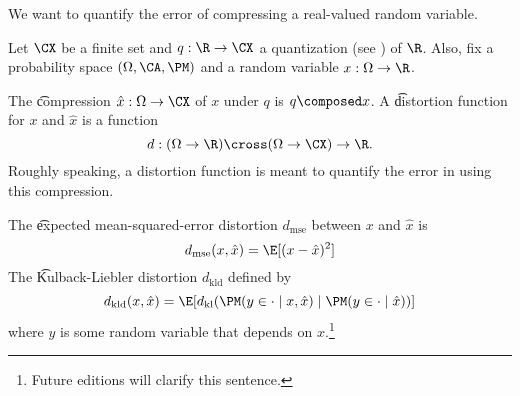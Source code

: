 


We want to quantify the error of compressing a real-valued random variable.


Let $\CX$ be a finite set and $q: \R \to \CX$ a quantization (see ) of $\R$.
Also, fix a probability space $(\Omega, \CA, \PM)$ and a random variable $x: \Omega \to \R$.


The \t{compression} $\hat{x}: \Omega \to \CX$ of $x$ under $q$ is $q \composed x$.
A \t{distortion function} for $x$ and $\hat{x}$ is a function
\[
  d: (\Omega \to \R) \cross (\Omega \to \CX) \to \R.
\]
Roughly speaking, a distortion function is meant to quantify the error in using this compression.


The \t{expected mean-squared-error distortion} $d_{\text{mse}}$ between $x$ and $\hat{x}$ is
\[
  d_{\text{mse}}(x, \hat{x}) = \E[(x - \hat{x})^2]
\]
The \t{Kulback-Liebler distortion} $d_{\text{kld}}$ defined by
\[
    d_{\text{kld}}(x, \hat{x}) = \E[d_{\text{kl}}(\PM(y \in \cdot \mid x, \hat{x}) \mid \PM(y \in \cdot \mid \hat{x}))]
\]
where $y$ is some random variable that depends on $x$.\footnote{Future editions will clarify this sentence.}


\blankpage
